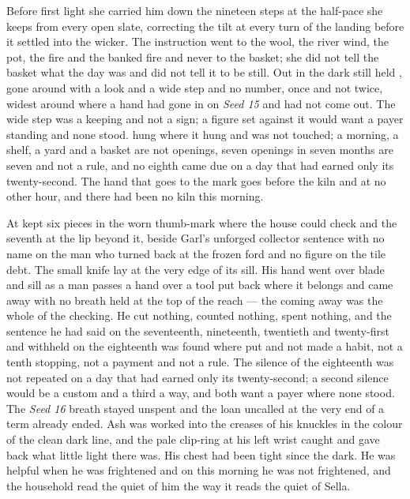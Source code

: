 Before first light she carried him down the nineteen steps at the half-pace she keeps from every open slate, correcting the tilt at every turn of the landing before it settled into the wicker. The instruction went to the wool, the river wind, the pot, the fire and the banked fire and never to the basket; she did not tell the basket what the day was and did not tell it to be still. Out in  the dark still held , gone around with a look and a wide step and no number, once and not twice, widest around  where a hand had gone in on \emph{Seed 15} and had not come out. The wide step was a keeping and not a sign; a figure set against it would want a payer standing and none stood.  hung where it hung and was not touched; a morning, a shelf, a yard and a basket are not openings, seven openings in seven months are seven and not a rule, and no eighth came due on a day that had earned only its twenty-second. The hand that goes to the mark goes before the kiln and at no other hour, and there had been no kiln this morning.

At   kept six pieces in the worn thumb-mark where the house could check and the seventh at the lip beyond it, beside Garl's unforged collector sentence with no name on the man who turned back at the frozen ford and no figure on the tile debt. The small knife lay at the very edge of its sill. His hand went over blade and sill as a man passes a hand over a tool put back where it belongs and came away with no breath held at the top of the reach --- the coming away was the whole of the checking. He cut nothing, counted nothing, spent nothing, and the sentence he had said on the seventeenth, nineteenth, twentieth and twenty-first and withheld on the eighteenth was found where put and not made a habit, not a tenth stopping, not a payment and not a rule. The silence of the eighteenth was not repeated on a day that had earned only its twenty-second; a second silence would be a custom and a third a way, and both want a payer where none stood. The \emph{Seed 16} breath stayed unspent and the loan uncalled at the very end of a term already ended. Ash was worked into the creases of his knuckles in the colour of the clean dark line, and the pale clip-ring at his left wrist caught and gave back what little light there was. His chest had been tight since the dark. He was helpful when he was frightened and on this morning he was not frightened, and the household read the quiet of him the way it reads the quiet of Sella.

